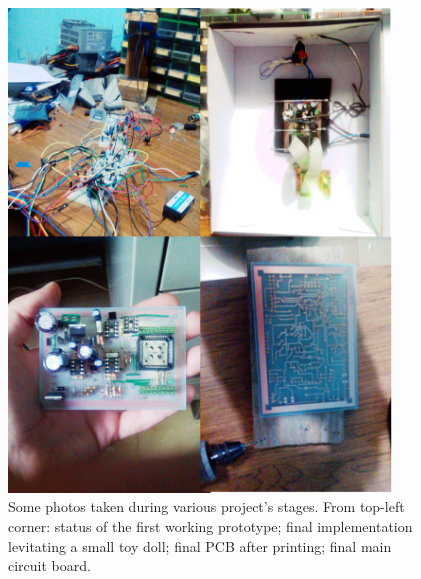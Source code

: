 \begin{figure}[htbp]
\centering
\includegraphics[width=4in]{Graphics/mosaic}
\caption{Some photos taken during various project's stages. From top-left corner: status of the first working prototype; final implementation levitating a small toy doll; final PCB after printing; final main circuit board.}
\end{figure}
